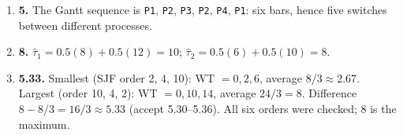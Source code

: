 \documentclass[11pt]{article}
\begin{document}
\begin{enumerate}
\item[\textbf{Q8}] \textbf{5.} The Gantt sequence is \texttt{P1}, \texttt{P2}, \texttt{P3}, \texttt{P2}, \texttt{P4}, \texttt{P1}: six bars, hence five switches between different processes.

\item[\textbf{Q9}] \textbf{8.} $\hat{\tau}_1 = 0.5(8) + 0.5(12) = 10$; $\hat{\tau}_2 = 0.5(6) + 0.5(10) = 8$.

\item[\textbf{Q10}] \textbf{5.33.} Smallest (SJF order 2, 4, 10): WT $= 0, 2, 6$, average $8/3 \approx 2.67$. Largest (order 10, 4, 2): WT $= 0, 10, 14$, average $24/3 = 8$. Difference $8 - 8/3 = 16/3 \approx 5.33$ (accept 5.30--5.36). All six orders were checked; 8 is the maximum.
\end{enumerate}
\end{document}
